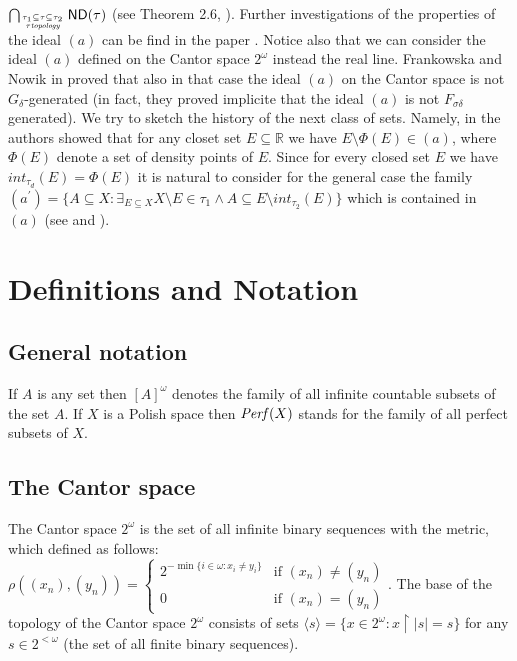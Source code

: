 \documentclass[12pt]{amsart}
\theoremstyle{plain}
\theoremstyle{definition}
\theoremstyle{remark}
\newcommand{\Perf}{{\it Perf}}
\newcommand{\real}{\mathbb{R}}
\newcommand{\mathint}{\mathit{int}}
\newcommand{\aideal}{\mathit{(a)}}
\newcommand{\aidealprime}{\mathit{(a^\prime)}}
\begin{document}
$\bigcap_{\tau_1 \subseteq \tau \subseteq \tau_2 \atop \tau \hbox{\tiny \it
topology}} \mathsf{ND}(\tau)$ (see Theorem 2.6, \cite{N}).
Further investigations of the properties of the ideal $(a)$ can be find in the paper  
\cite{FG}.
Notice also that we can consider the ideal $(a)$ defined on the Cantor
space $2^{\omega}$ instead the real line. 
Frankowska and Nowik in \cite{FN1} proved that also in that case
the ideal $\aideal$ on the Cantor space is 
not $G_{\delta}$-generated (in fact, they proved implicite that the ideal $(a)$ is not
$F_{\sigma\delta}$ generated).
  We try to sketch the history of the next class of sets. Namely, in \cite{GS}
the authors showed that for any closet set $E\subseteq \real$ we have
$E\setminus \Phi(E) \in (a)$, where $\Phi(E)$ denote a set of
density points of $E$. Since for every closed set $E$ we have
$\mathint_{\tau_d}(E) = \Phi(E)$ it is natural to consider for the
general case the family 
$\aidealprime = \lbrace A \subseteq X\colon \exists_{E \subseteq X} 
X\setminus E \in \tau_1 \wedge A \subseteq E \setminus  \mathint_{\tau_2}(E) \rbrace$
which is contained in $\aideal$ (see \cite{GS} and \cite{N}).

\section{Definitions and Notation}
\subsection{General notation}
If $A$ is any set then
$[A]^\omega$ denotes the
family of all infinite countable
subsets of the set $A$.
If $X$ is a Polish space then $\Perf(X)$ 
stands for the family of all perfect subsets of $X$.

\subsection{The Cantor space}
The Cantor space $2^\omega$ is the set of all infinite binary sequences with the metric, which 
defined as follows: 
$\rho((x_n), (y_n)) = \begin{cases}
     2^{-\min\lbrace i \in \omega\colon x_i \not= y_i\rbrace} & \text{if }(x_n) \not= (y_n)\\
     0      & \text{if }(x_n) = (y_n)
\end{cases}$.
The base of the topology of the Cantor space $2^\omega$ consists of sets 
$\langle s \rangle = \lbrace x \in 2^\omega\colon x \restriction |s| = s\rbrace$ for any $s\in 2^{<\omega}$ (the set of all finite binary sequences).
\end{document}
